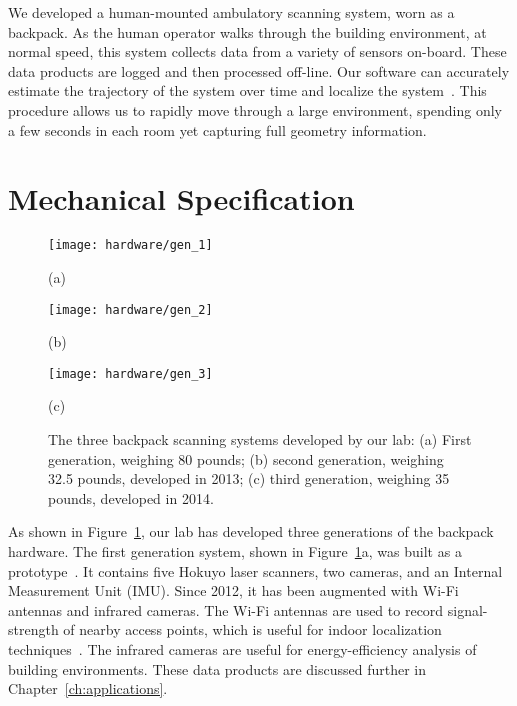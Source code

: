 \documentclass[12pt,onecolumn,oneside]{book}
\begin{document}
We developed a human-mounted ambulatory scanning system, worn as a backpack.  As the human operator walks through the building environment, at normal speed, this system collects data from a variety of sensors on-board.  These data products are logged and then processed off-line.  Our software can accurately estimate the trajectory of the system over time and localize the system~\cite{NickJournal}.  This procedure allows us to rapidly move through a large environment, spending only a few seconds in each room yet capturing full geometry information.

\section{Mechanical Specification}
\label{sec:mechanical}

\begin{figure}

	\centering
	\begin{minipage}[c]{0.32\linewidth}
		\centerline{\texttt{[image: hardware/gen\_1]}}
		\centerline{(a)}\medskip
	\end{minipage}
	\hfill
	\begin{minipage}[c]{0.32\linewidth}
		\centerline{\texttt{[image: hardware/gen\_2]}}
		\centerline{(b)}\medskip
	\end{minipage}
	\hfill
	\begin{minipage}[c]{0.32\linewidth}
		\centerline{\texttt{[image: hardware/gen\_3]}}
		\centerline{(c)}\medskip
	\end{minipage}	

	\caption[The three backpack scanning systems developed by our lab.]{The three backpack scanning systems developed by our lab:  (a) First generation, weighing 80 pounds; (b) second generation, weighing 32.5 pounds, developed in 2013; (c) third generation, weighing 35 pounds, developed in 2014.}
	\label{fig:all_backpacks}

\end{figure}

As shown in Figure~\ref{fig:all_backpacks}, our lab has developed three generations of the backpack hardware.  The first generation system, shown in Figure~\ref{fig:all_backpacks}a, was built as a prototype~\cite{Backpack}.  It contains five Hokuyo laser scanners, two cameras, and an Internal Measurement Unit (IMU).  Since 2012, it has been augmented with Wi-Fi antennas and infrared cameras.  The Wi-Fi antennas are used to record signal-strength of nearby access points, which is useful for indoor localization techniques~\cite{Levchev14}.  The infrared cameras are useful for energy-efficiency analysis of building environments.  These data products are discussed further in Chapter~\ref{ch:applications}.
\end{document}
